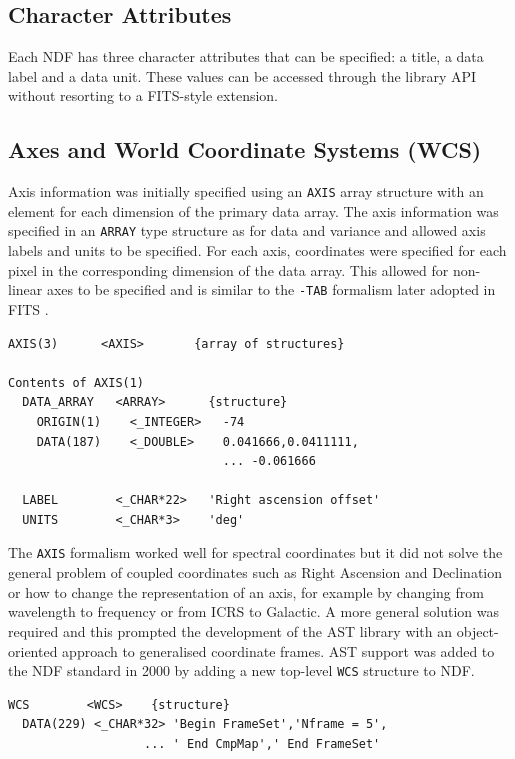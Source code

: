 \documentclass[final,authoryear,5p,times,twocolumn]{elsarticle}
\begin{document}
\subsection{Character Attributes}

Each NDF has three character attributes that can be specified: a
title, a data label and a data unit. These values can be accessed
through the library API without resorting to a FITS-style extension.

\subsection{Axes and World Coordinate Systems (WCS)}

Axis information was initially specified using an \texttt{AXIS} array
structure with an element for each dimension of the primary data
array. The axis information was specified in an \texttt{ARRAY} type
structure as for data and variance and allowed axis labels and units
to be specified. For each axis, coordinates were specified for each
pixel in the corresponding dimension of the data array. This allowed
for non-linear axes to be specified and is similar to the
\texttt{-TAB} formalism later adopted in FITS \citep{2006A&A...446..747G}.

{\small
\begin{verbatim}
AXIS(3)      <AXIS>       {array of structures}

Contents of AXIS(1)
  DATA_ARRAY   <ARRAY>      {structure}
    ORIGIN(1)    <_INTEGER>   -74
    DATA(187)    <_DOUBLE>    0.041666,0.0411111,
                              ... -0.061666

  LABEL        <_CHAR*22>   'Right ascension offset'
  UNITS        <_CHAR*3>    'deg'
\end{verbatim}
}

The \texttt{AXIS} formalism worked well for spectral coordinates but
it did not solve the general problem of coupled coordinates such as
Right Ascension and Declination or how to change the representation of
an axis, for example by changing from wavelength to frequency or from
ICRS to Galactic. A more general solution was required and this
prompted the development of the AST library
\citep{1998ASPC..145...41W} with an object-oriented approach to
generalised coordinate frames. AST support was added to the NDF
standard in 2000 \citep{2001ASPC..238..129B} by adding a new top-level
\texttt{WCS} structure to NDF.

{\small
\begin{verbatim}
WCS        <WCS>    {structure}
  DATA(229) <_CHAR*32> 'Begin FrameSet','Nframe = 5',
                   ... ' End CmpMap',' End FrameSet'
\end{verbatim}
}
\end{document}

